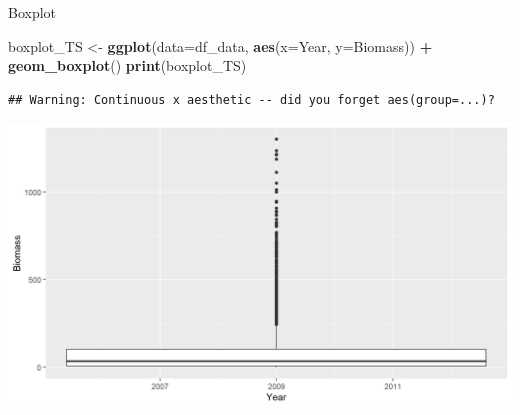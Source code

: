 \documentclass[
  ignorenonframetext,
]{beamer}
\newenvironment{Shaded}{\begin{snugshade}}{\end{snugshade}}
\newcommand{\DataTypeTok}[1]{\textcolor[rgb]{0.13,0.29,0.53}{#1}}
\newcommand{\KeywordTok}[1]{\textcolor[rgb]{0.13,0.29,0.53}{\textbf{#1}}}
\newcommand{\NormalTok}[1]{#1}
\newcommand{\OperatorTok}[1]{\textcolor[rgb]{0.81,0.36,0.00}{\textbf{#1}}}
\newcommand{\StringTok}[1]{\textcolor[rgb]{0.31,0.60,0.02}{#1}}
\begin{document}
\begin{frame}[fragile]{Boxplot}
\protect\hypertarget{boxplot}{}

\begin{Shaded}
\begin{Highlighting}[]
\NormalTok{boxplot_TS <-}\StringTok{ }\KeywordTok{ggplot}\NormalTok{(}\DataTypeTok{data=}\NormalTok{df_data, }\KeywordTok{aes}\NormalTok{(}\DataTypeTok{x=}\NormalTok{Year, }\DataTypeTok{y=}\NormalTok{Biomass)) }\OperatorTok{+}\StringTok{ }
\StringTok{  }\KeywordTok{geom_boxplot}\NormalTok{()}
\KeywordTok{print}\NormalTok{(boxplot_TS)}
\end{Highlighting}
\end{Shaded}

\begin{verbatim}
## Warning: Continuous x aesthetic -- did you forget aes(group=...)?
\end{verbatim}

\begin{center}\includegraphics[width=0.8\linewidth]{figure/boxplot_TS-1} \end{center}

\end{frame}
\end{document}
